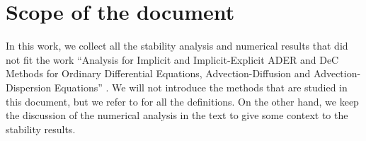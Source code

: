 \section{Scope of the document} 
\label{sec:introduction} 
In this work, we collect all the stability analysis and numerical results that did not fit the work ``Analysis for Implicit and Implicit-Explicit ADER and DeC Methods for Ordinary Differential Equations, Advection-Diffusion and Advection-Dispersion Equations'' \cite{petri2024analysis}.
We will not introduce the methods that are studied in this document, but we refer to \cite{petri2024analysis} for all the definitions. On the other hand, we keep the discussion of the numerical analysis in the text to give some context to the stability results.

%


